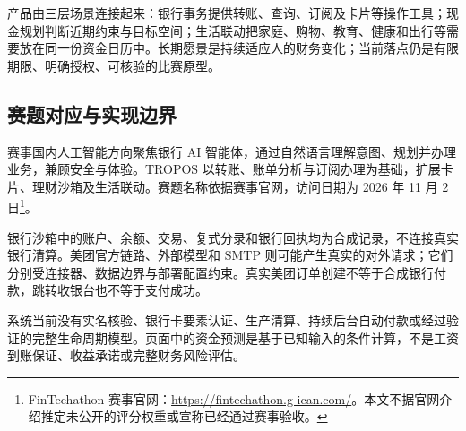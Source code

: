 产品由三层场景连接起来：银行事务提供转账、查询、订阅及卡片等操作工具；现金规划判断近期约束与目标空间；生活联动把家庭、购物、教育、健康和出行等需要放在同一份资金日历中。长期愿景是持续适应人的财务变化；当前落点仍是有限期限、明确授权、可核验的比赛原型。

\subsection{赛题对应与实现边界}
赛事国内人工智能方向聚焦银行 AI 智能体，通过自然语言理解意图、规划并办理业务，兼顾安全与体验。TROPOS 以转账、账单分析与订阅办理为基础，扩展卡片、理财沙箱及生活联动。赛题名称依据赛事官网，访问日期为 2026 年 11 月 2 日\footnote{FinTechathon 赛事官网：\url{https://fintechathon.g-ican.com/}。本文不据官网介绍推定未公开的评分权重或宣称已经通过赛事验收。}。

银行沙箱中的账户、余额、交易、复式分录和银行回执均为合成记录，不连接真实银行清算。美团官方链路、外部模型和 SMTP 则可能产生真实的对外请求；它们分别受连接器、数据边界与部署配置约束。真实美团订单创建不等于合成银行付款，跳转收银台也不等于支付成功。

系统当前没有实名核验、银行卡要素认证、生产清算、持续后台自动付款或经过验证的完整生命周期模型。页面中的资金预测是基于已知输入的条件计算，不是工资到账保证、收益承诺或完整财务风险评估。
